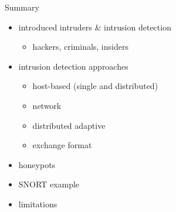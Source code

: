 \documentclass{beamer}
\begin{document}
\begin{frame}{Summary}
  \begin{itemize}
  \item introduced intruders \& intrusion detection 
    \begin{itemize}
    \item hackers, criminals, insiders 
    \end{itemize}
  \item intrusion detection approaches 
    \begin{itemize}
    \item host-based (single and distributed) 
    \item network 
    \item distributed adaptive 
    \item exchange format 
    \end{itemize}
  \item honeypots 
  \item SNORT example 
  \item limitations
  \end{itemize}
\end{frame}
\end{document}
